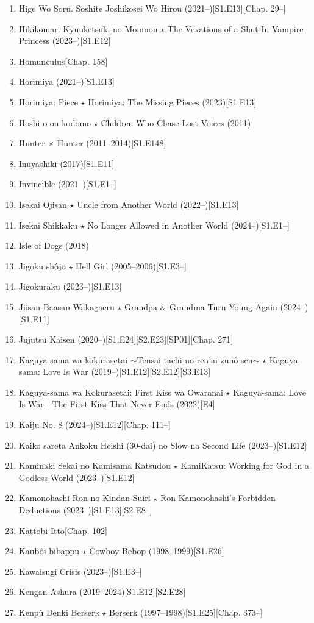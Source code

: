\documentclass{article}
\begin{document}
\begin{enumerate}
    \item {\sc Hige Wo Soru. Soshite Joshikosei Wo Hirou} (2021--)\hfill[S1.E13][Chap. 29--]
    \item {\sc Hikikomari Kyuuketsuki no Monmon $\star$ The Vexations of a Shut-In Vampire Princess} (2023--)\hfill[S1.E12]
    \item {\sc Homunculus}\hfill[Chap. 158]
    \item {\sc Horimiya} (2021--)\hfill[S1.E13]
    \item {\sc Horimiya: Piece $\star$ Horimiya: The Missing Pieces} (2023)\hfill[S1.E13]
    \item {\sc Hoshi o ou kodomo $\star$ Children Who Chase Lost Voices} (2011)
    \item {\sc Hunter $\times$ Hunter} (2011--2014)\hfill[S1.E148]
    \item {\sc Inuyashiki} (2017)\hfill[S1.E11]
    \item Invincible (2021--)\hfill[S1.E1--]
    \item Isekai Ojisan $\star$ Uncle from Another World (2022--)\hfill[S1.E13]
    \item Isekai Shikkaku $\star$ No Longer Allowed in Another World (2024--)\hfill[S1.E1--]
    \item {\sc Isle of Dogs} (2018)
    \item Jigoku shôjo $\star$ Hell Girl (2005--2006)\hfill[S1.E3--]
    \item Jigokuraku (2023--)\hfill[S1.E13]
    \item {\sc Jiisan Baasan Wakagaeru $\star$ Grandpa \& Grandma Turn Young Again} (2024--)\hfill[S1.E11]
    \item {\sc Jujutsu Kaisen} (2020--)\hfill[S1.E24][S2.E23][SP01][Chap. 271]
    \item Kaguya-sama wa kokurasetai $\sim$Tensai tachi no ren'ai zun\^o sen$\sim$ $\star$ Kaguya-sama: Love Is War (2019--)\hfill[S1.E12][S2.E12][S3.E13]
    \item {\sc Kaguya-sama wa Kokurasetai: First Kiss wa Owaranai $\star$ Kaguya-sama: Love Is War - The First Kiss That Never Ends} (2022)\hfill[E4]
    \item Kaiju No. 8 (2024--)\hfill[S1.E12][Chap. 111--]
    \item Kaiko sareta Ankoku Heishi (30-dai) no Slow na Second Life (2023--)\hfill[S1.E12]
    \item {\sc Kaminaki Sekai no Kamisama Katsudou $\star$ KamiKatsu: Working for God in a Godless World} (2023--)\hfill[S1.E12]
    \item {\sc Kamonohashi Ron no Kindan Suiri $\star$ Ron Kamonohashi's Forbidden Deductions} (2023--)\hfill[S1.E13][S2.E8--]
    \item {\sc Kattobi Itto}\hfill[Chap. 102]
    \item {\sc Kaub\^oi bibappu $\star$ Cowboy Bebop} (1998--1999)\hfill[S1.E26]
    \item Kawaisugi Crisis (2023--)\hfill[S1.E3--]
    \item {\sc Kengan Ashura} (2019--2024)\hfill[S1.E12][S2.E28]
    \item {\sc Kenp\^u Denki Berserk $\star$ Berserk} (1997--1998)\hfill[S1.E25][Chap. 373--]
    

\end{enumerate}
\end{document}
